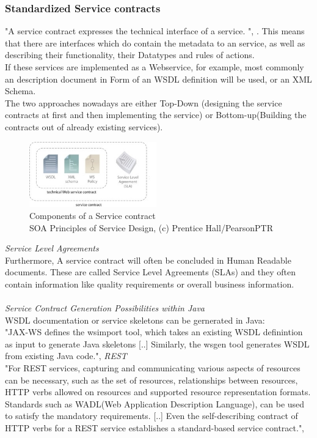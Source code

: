 \documentclass[12pt]{article}
\begin{document}
\subsubsection{Standardized Service contracts}
\label{sec:StandardizedServicecontracts}
"A service contract expresses the technical interface of a service. ", \cite[page 33]{grau}. This means that there are interfaces which do contain the metadata to an service, as well as describing their functionality, their Datatypes and rules of actions. \cite[page 86]{te} \\ If these services are implemented as a Webservice, for example, most commonly an description document in Form of an WSDL definition will be used, or an XML Schema. \\
The two approaches nowadays are either Top-Down (designing the service contracts at first and then implementing the service) or Bottom-up(Building the contracts out of already existing services). \cite[page 151,152]{grau}
\begin{figure}
	\centering
	\includegraphics[width=0.49\textwidth]{images/soajuhu}
	\caption{Components of a Service contract \cite{photos}\\ SOA Principles of Service Design, (c) Prentice Hall/PearsonPTR }
	\label{fig:servicecontractcomponents}
	\end{figure}
\FloatBarrier
 \noindent\textit{Service Level Agreements} \\
Furthermore, A service contract will often be concluded in Human Readable documents. These are called Service Level Agreements (SLAs) and they often contain information like quality requirements or overall business information. 
\\ \\
\textit{Service Contract Generation Possibilities within Java} \\
WSDL documentation or service skeletons can be gernerated in Java:\\ 
"JAX-WS defines the wsimport tool, which takes an existing WSDL definintion as input to generate Java skeletons [..] Similarly, the wsgen tool generates WSDL from existing Java code.",\cite[page 151]{grau}
 \noindent\textit{REST}\\
"For REST services, capturing and communicating various aspects of resources can be necessary, such as the set of resources, relationships between resources, HTTP verbs allowed on resources and supported resource representation formats. Standards such as WADL(Web Application Description Language), can be used to satisfy the mandatory requirements. [..] Even the self-describing contract of HTTP verbs for a REST service establishes a standard-based service contract.", \cite[page 151]{grau}
\end{document}
